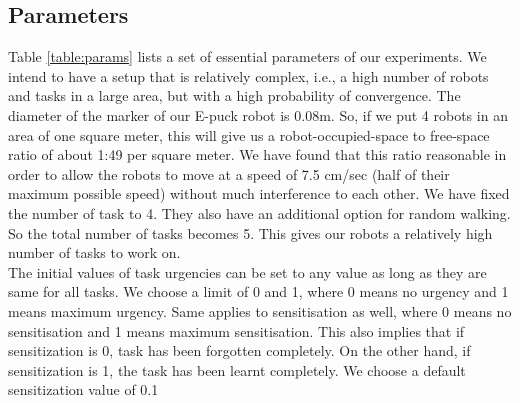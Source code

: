 \documentclass{llncs}
\begin{document}
\subsection{Parameters}
Table \ref{table:params} lists a set of essential parameters of our experiments. We intend to have a setup that is relatively complex, i.e., a high number of robots and tasks in a large area, but with a high probability of convergence. The diameter of the marker of our E-puck robot is 0.08m. So, if we put 4 robots in an area of one square meter, this will give us a robot-occupied-space to free-space ratio of about 1:49 per square meter. We have found that this ratio reasonable in order to allow the robots to move at a speed of 7.5 cm/sec (half of their maximum possible speed) without much interference to each other. We have fixed the number of task to 4. They also have an additional option for random walking. So the total number of tasks becomes 5. This gives our robots a relatively high number of tasks to work on. \\
The initial values of task urgencies can be set to any value as long as they are same for all tasks. We choose a limit of 0 and 1, where 0 means no urgency and 1 means maximum urgency. Same applies to sensitisation as well, where 0 means no sensitisation and 1 means maximum sensitisation. This also implies that if sensitization is 0, task has been forgotten completely. On the other hand, if sensitization is 1, the task has been learnt completely. We choose a default sensitization value of 0.1 
\end{document}
